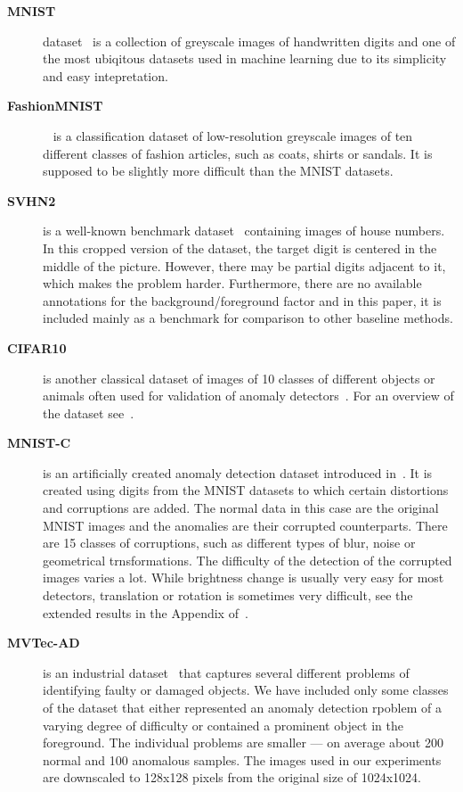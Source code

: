 \begin{description}

    \item[\textbf{MNIST}] dataset~\cite{lecun2010mnist} is a collection of greyscale images of handwritten digits and one of the most ubiqitous datasets used in machine learning due to its simplicity and easy intepretation.
    
    \item[\textbf{FashionMNIST}]~\cite{xiao2017fashion} is a classification dataset of low-resolution greyscale images of ten different classes of fashion articles, such as coats, shirts or sandals. It is supposed to be slightly more difficult than the MNIST datasets.

    \item[\textbf{SVHN2}] is a well-known benchmark dataset~\cite{netzer2011reading} containing images of house numbers. In this cropped version of the dataset, the target digit is centered in the middle of the picture. However, there may be partial digits adjacent to it, which makes the problem harder. Furthermore, there are no available annotations for the background/foreground factor and in this paper, it is included mainly as a benchmark for comparison to other baseline methods. 
    
    \item[\textbf{CIFAR10}] is another classical dataset of images of 10 classes of different objects or animals often used for validation of anomaly detectors~\cite{ruff2018deep, ruff2019deep, chalapathy2018anomaly}. For an overview of the dataset see~\cite{krizhevsky2009learning}. 

    \item[\textbf{MNIST-C}] is an artificially created anomaly detection dataset introduced in~\cite{muMNISTCRobustnessBenchmark2019}. It is created using digits from the MNIST datasets to which certain distortions and corruptions are added. The normal data in this case are the original MNIST images and the anomalies are their corrupted counterparts. There are 15 classes of corruptions, such as different types of blur, noise or geometrical trnsformations. The difficulty of the detection of the corrupted images varies a lot. While brightness change is usually very easy for most detectors, translation or rotation is sometimes very difficult, see the extended results in the Appendix of~\cite{vskvara2021comparison}.

    \item[\textbf{MVTec-AD}] is an industrial dataset~\cite{bergmann2019mvtec} that captures several different problems of identifying faulty or damaged objects. We have included only some classes of the dataset that either represented an anomaly detection rpoblem of a varying degree of difficulty or contained a prominent object in the foreground. The individual problems are smaller --- on average about 200 normal and 100 anomalous samples. The images used in our experiments are downscaled to 128x128 pixels from the original size of 1024x1024.
    

\end{description}
